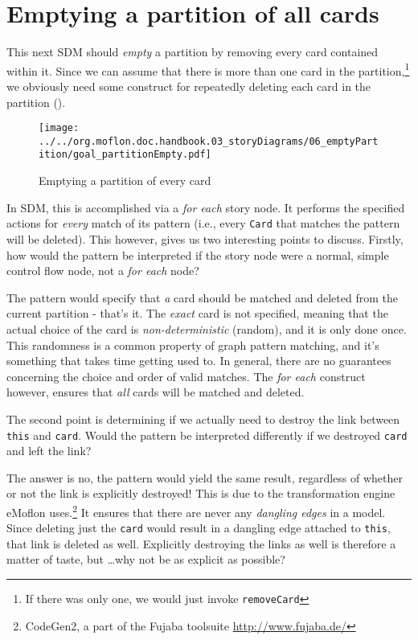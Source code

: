 \newpage
\hypertarget{sec:emptyPartition}{}
\section{Emptying a partition of all cards}
\genHeader

This next SDM should \emph{empty} a partition by removing every card contained within it. Since we can assume that there is more than one card in the
partition,\footnote{If there was only one, we would just invoke \texttt{removeCard}} we obviously need some construct for repeatedly deleting each card in the
partition (). 

\begin{figure}[htbp]
	\centering
  \texttt{[image: ../../org.moflon.doc.handbook.03\_storyDiagrams/06\_emptyPartition/goal\_partitionEmpty.pdf]}
	\caption{Emptying a partition of every card}
	\label{fig:goal_empty}
\end{figure}
\FloatBarrier

In SDM, this  is accomplished via a \emph{for each} story node. It performs the specified actions for \emph{every} match of its
pattern (i.e., every \texttt{Card} that matches the pattern will be deleted). This however, gives us two interesting points to discuss.
Firstly, how would the pattern be interpreted if the story node were a normal, simple control flow node, not a \emph{for each} node?

The pattern would specify that \emph{a} card should be matched and deleted from the current partition - that's it. The \emph{exact} card is not specified,
meaning that the actual choice of the card is \emph{non-deterministic} (random), and it is only done once. This randomness is a common property of graph pattern
matching, and it's something that takes time getting used to.  In general, there are no guarantees concerning the choice and order of valid matches. The
\emph{for each} construct however, ensures that \emph{all} cards will be matched and deleted.

The second point is determining if we actually need to destroy the link between \texttt{this} and \texttt{card}. Would the pattern be interpreted differently if
 we destroyed \texttt{card} and left the link?

The answer is no, the pattern would yield the same result, regardless of whether or not the link is explicitly destroyed! This is due to
the transformation engine eMoflon uses.\footnote{CodeGen2, a part of the Fujaba toolsuite \url{http://www.fujaba.de/}} It ensures that
there are never any \emph{dangling edges} in a model. Since deleting just the \texttt{card} would result in a dangling edge attached to \texttt{this}, that
link is deleted as well. Explicitly destroying the links as well is therefore a matter of taste, but \ldots why not be as explicit as possible?


